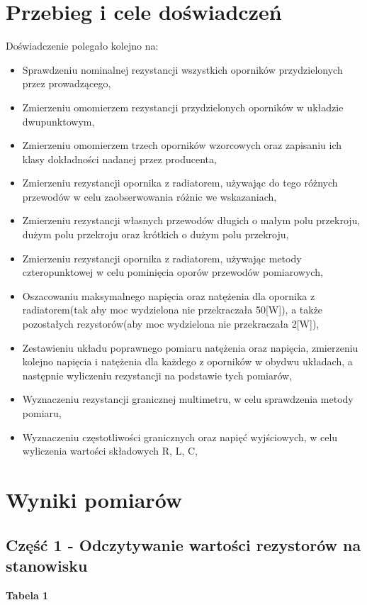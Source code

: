 \documentclass[11pt]{article}
\begin{document}
    \section{Przebieg i cele doświadczeń}
    Doświadczenie polegało kolejno na:
    \begin{itemize}
        \setlength\itemsep{0em}
        \item Sprawdzeniu nominalnej rezystancji wszystkich oporników przydzielonych przez prowadzącego,
        \item Zmierzeniu omomierzem rezystancji przydzielonych oporników w układzie dwupunktowym,
        \item Zmierzeniu omomierzem trzech oporników wzorcowych oraz zapisaniu ich klasy dokładności nadanej przez producenta,
        \item Zmierzeniu rezystancji opornika z radiatorem, używając do tego różnych przewodów w celu zaobserwowania różnic we wskazaniach,
        \item Zmierzeniu rezystancji własnych przewodów długich o małym polu przekroju, dużym polu przekroju oraz krótkich o dużym polu przekroju,
        \item Zmierzeniu rezystancji opornika z radiatorem, używając metody czteropunktowej w celu pominięcia oporów przewodów pomiarowych,
        \item Oszacowaniu maksymalnego napięcia oraz natężenia dla opornika z radiatorem(tak aby moc wydzielona nie przekraczała 50[W]), a także pozostałych rezystorów(aby moc wydzielona nie przekraczała 2[W]),
        \item Zestawieniu układu poprawnego pomiaru natężenia oraz napięcia, zmierzeniu kolejno napięcia i natężenia dla
        każdego z oporników w obydwu układach, a następnie wyliczeniu rezystancji na podstawie tych pomiarów,
        \item Wyznaczeniu rezystancji granicznej multimetru, w celu sprawdzenia metody pomiaru,
        \item Wyznaczeniu częstotliwości granicznych oraz napięć wyjściowych, w celu wyliczenia wartości składowych R, L, C,
    \end{itemize}

    \section{Wyniki pomiarów}
    \subsection*{Część 1 - Odczytywanie wartości rezystorów na stanowisku}
    \begin{center}
        \small{\textbf{Tabela 1}}
    \end{center}
    \begin{center}
    \end{center}
\end{document}
